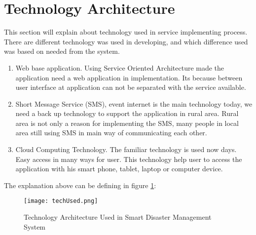 \section{Technology Architecture}
This section will explain about technology used in service implementing process. There are different technology was used in developing, and which difference used was based on needed from the system.
\begin{enumerate}
\item Web base application. Using Service Oriented Architecture made the application need a web application in implementation. Its because between user interface at application can not be separated with the service available.
\item Short Message Service (SMS), event internet is the main technology today, we need a back up technology to support the application in rural area. Rural area is not only a reason for implementing the SMS, many people in local area still using SMS in main way of communicating each other.
\item Cloud Computing Technology. The familiar technology is used now days. Easy access in many ways for user. This technology help user to access the application with his smart phone, tablet, laptop or computer device. 
\end{enumerate}
The explanation above can be defining in figure \ref{fig:TechUsed}:
\begin{figure}[H]
\centering
\texttt{[image: techUsed.png]}
\label{fig:TechUsed}
\caption{Technology Architecture Used in Smart Disaster Management System}
\end{figure}


\begin{comment}
\begin{table}[h!]
\begin{center}
\caption{Application Service Candidates}
\label{tab: AppServCand}
	\vspace{0.1cm}
\begin{tabular}{ |>{\centering\arraybackslash}m{2cm}|>{\centering\arraybackslash}m{3cm}|>{\centering\arraybackslash}m{5cm}|}
 \hline
 \textbf{Actors} & \textbf{Use Cases} & \textbf{Descriptions} \\
 \hline \hline
  &  &  \\
 \hline 
 &  &  \\
 \hline
 &  &  \\
 \hline
 &  & \\
 \hline
\end{tabular}
\end{center}
\end{table}\par
\end{comment}